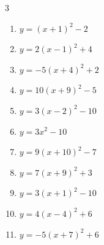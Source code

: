\begin{multicols}{3}
\begin{enumerate}
  \item $\displaystyle y=\left( x+1\right)^{2}-2$

        \phantom{$\displaystyle 頂点\left( -1 , -2 \right)$}

  \item $\displaystyle y=2\left( x-1\right)^{2}+4$

        \phantom{$\displaystyle 頂点\left( 1 , 4 \right)$}

  \item $\displaystyle y=-5\left( x+4\right)^{2}+2$

        \phantom{$\displaystyle 頂点\left( -4 , 2 \right)$}

  \item $\displaystyle y=10\left( x+9\right)^{2}-5$

        \phantom{$\displaystyle 頂点\left( -9 , -5 \right)$}

  \item $\displaystyle y=3\left( x-2\right)^{2}-10$

        \phantom{$\displaystyle 頂点\left( 2 , -10 \right)$}

  \item $\displaystyle y=3x^{2}-10$

        \phantom{$\displaystyle 頂点\left( 0 , -10 \right)$}

  \item $\displaystyle y=9\left( x+10\right)^{2}-7$

        \phantom{$\displaystyle 頂点\left( -10 , -7 \right)$}

  \item $\displaystyle y=7\left( x+9\right)^{2}+3$

        \phantom{$\displaystyle 頂点\left( -9 , 3 \right)$}

  \item $\displaystyle y=3\left( x+1\right)^{2}-10$

        \phantom{$\displaystyle 頂点\left( -1 , -10 \right)$}

\columnbreak %

  \item $\displaystyle y=4\left( x-4\right)^{2}+6$

        \phantom{$\displaystyle 頂点\left( 4 , 6 \right)$}

  \item $\displaystyle y=-5\left( x+7\right)^{2}+6$

        \phantom{$\displaystyle 頂点\left( -7 , 6 \right)$}


\end{enumerate}
\end{multicols}
